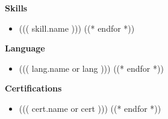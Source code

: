 \documentclass[11pt,a4paper]{article}
\begin{document}
\begin{minipage}[t]{\textwidth}
\begin{minipage}[t]{0.9\textwidth}
\begin{minipage}[t]{0.62\textwidth}
\end{minipage}
\hfill
\begin{minipage}[t]{0.32\textwidth}
\vspace{0pt}


{\color{teal-pri}\faCircle\space\space\space\bfseries\large Skills}\\[15pt]
\hspace{15pt}
\begin{minipage}{0.85\linewidth}
\begin{itemize}[leftmargin=8pt, itemsep=4pt, parsep=0pt, topsep=0pt]
((* for skill in skills *))
\item {\fontsize{9}{11}\selectfont ((( skill.name )))}
((* endfor *))
\end{itemize}
\end{minipage}
\vspace{25pt}

{\color{teal-pri}\faCircle\space\space\space\bfseries\large Language}\\[15pt]
\hspace{15pt}
\begin{minipage}{0.85\linewidth}
\begin{itemize}[leftmargin=8pt, itemsep=4pt, parsep=0pt, topsep=0pt]
((* for lang in languages *))
\item {\fontsize{9}{11}\selectfont ((( lang.name or lang )))}
((* endfor *))
\end{itemize}
\end{minipage}
\vspace{25pt}

{\color{teal-pri}\faCircle\space\space\space\bfseries\large Certifications}\\[15pt]
\hspace{15pt}
\begin{minipage}{0.85\linewidth}
\begin{itemize}[leftmargin=8pt, itemsep=4pt, parsep=0pt, topsep=0pt]
((* for cert in certifications *))
\item {\fontsize{9}{11}\selectfont ((( cert.name or cert )))}
((* endfor *))
\end{itemize}
\end{minipage}

\end{minipage}

\end{minipage}
\end{minipage}
\end{document}
